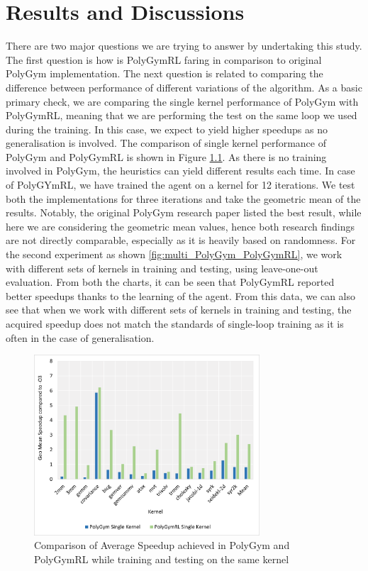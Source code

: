 \documentclass[logo,msc]{infthesis}           %
\begin{document}
\chapter{Results and Discussions}
There are two major questions we are trying to answer by undertaking this study. The first question is how is PolyGymRL faring in comparison to original PolyGym implementation. The next question is related to comparing the difference between performance of different variations of the algorithm. As a basic primary check, we are comparing the single kernel performance of PolyGym with PolyGymRL, meaning that we are performing the test on the same loop we used during the training. In this case, we expect to yield higher speedups as no generalisation is involved. The comparison of single kernel performance of PolyGym and PolyGymRL is shown in Figure \ref{fig:single_PolyGym_PolyGymRL}. As there is no training involved in PolyGym, the heuristics can yield different results each time.  In case of PolyGYmRL, we have trained the agent on a kernel for 12 iterations. We test both the implementations for three iterations and take the geometric mean of the results. Notably, the original PolyGym research paper listed the best result, while here we are considering the geometric mean values, hence both research findings are not directly comparable, especially as it is heavily based on randomness. For the second experiment as shown \ref{fig:multi_PolyGym_PolyGymRL}, we work with different sets of kernels in training and testing, using leave-one-out evaluation. From both the charts, it can be seen that PolyGymRL reported better speedups thanks to the learning of the agent. From this data, we can also see that when we work with different sets of kernels in training and testing, the acquired speedup does not match the standards of single-loop training as it is often in the case of generalisation.

\begin{figure}[htbp]
  \centering
  \includegraphics[width=0.75\textwidth]{Images/Chart_Single_PolyGym_PolyGymRL.png}    
  \caption{Comparison of Average Speedup achieved in PolyGym and PolyGymRL while training and testing on the same kernel}
  \label{fig:single_PolyGym_PolyGymRL}
\end{figure}
\end{document}
